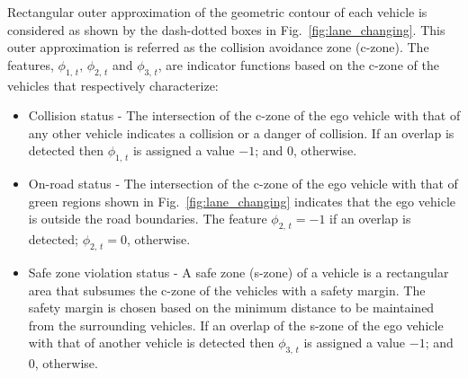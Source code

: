 \documentclass[10pt,journal]{IEEEtran}
\begin{document}
	Rectangular outer approximation of the geometric contour of each vehicle is considered as shown by the dash-dotted boxes in Fig.~\ref{fig:lane_changing}. This outer approximation is referred as the collision avoidance zone (c-zone). The features, $\phi_{1,\,{t}},\,\phi_{2,\,{t}}$ and $\phi_{3,\,{t}}$, are indicator functions based on the c-zone of the vehicles that respectively characterize:
	\begin{itemize}
		\item Collision status - The intersection of the c-zone of the ego vehicle with that of any other vehicle indicates a collision or a danger of collision. If an overlap is detected then $\phi_{1,\,{t}}$ is assigned a value $-1$; and $0$, otherwise.
		
		\item On-road status - The intersection of the c-zone of the ego vehicle with that of green regions shown in Fig.~\ref{fig:lane_changing} indicates that the ego vehicle is outside the road boundaries. The feature $\phi_{2,\,{t}} = -1$ if an overlap is detected; $\phi_{2,\,{t}} = 0$, otherwise.
		
		\item Safe zone violation status - A safe zone (s-zone) of a vehicle is a rectangular area that subsumes the c-zone of the vehicles with a safety margin. The safety margin is chosen based on the minimum distance to be maintained from the surrounding vehicles. If an overlap of the s-zone of the ego vehicle with that of another vehicle is detected then $\phi_{3,\,{t}}$ is assigned a value $-1$; and $0$, otherwise.		
		
		
	\end{itemize}
	 
\end{document}
